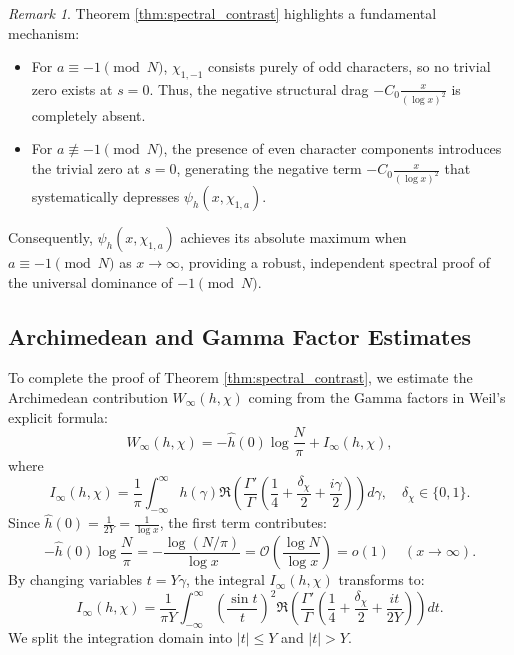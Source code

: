 \documentclass[12pt,reqno]{amsart}
\theoremstyle{definition}
\theoremstyle{remark}
\newtheorem{remark}[theorem]{Remark}
\numberwithin{equation}{section}
\begin{document}
\begin{remark}
Theorem \ref{thm:spectral_contrast} highlights a fundamental mechanism:
\begin{itemize}
    \item For $a \equiv -1 \pmod N$, $\chi_{1,-1}$ consists purely of odd characters, so no trivial zero exists at $s = 0$. Thus, the negative structural drag $-C_0 \frac{x}{(\log x)^2}$ is completely absent.
    \item For $a \not\equiv -1 \pmod N$, the presence of even character components introduces the trivial zero at $s = 0$, generating the negative term $-C_0 \frac{x}{(\log x)^2}$ that systematically depresses $\psi_h(x, \chi_{1,a})$.
\end{itemize}
Consequently, $\psi_h(x, \chi_{1,a})$ achieves its absolute maximum when $a \equiv -1 \pmod N$ as $x \to \infty$, providing a robust, independent spectral proof of the universal dominance of $-1 \pmod N$.
\end{remark}

\subsection{Archimedean and Gamma Factor Estimates}
\label{subsec:gamma_factor}

To complete the proof of Theorem \ref{thm:spectral_contrast}, we estimate the Archimedean contribution $W_\infty(h, \chi)$ coming from the Gamma factors in Weil's explicit formula:
\[
W_\infty(h, \chi) = -\hat{h}(0) \log \frac{N}{\pi} + I_\infty(h, \chi),
\]
where
\[
I_\infty(h, \chi) = \frac{1}{\pi} \int_{-\infty}^{\infty} h(\gamma) \mathfrak{R}\left( \frac{\Gamma'}{\Gamma}\left( \frac{1}{4} + \frac{\delta_\chi}{2} + \frac{i\gamma}{2} \right) \right) d\gamma, \quad \delta_\chi \in \{0, 1\}.
\]
Since $\hat{h}(0) = \frac{1}{2Y} = \frac{1}{\log x}$, the first term contributes:
\[
-\hat{h}(0) \log \frac{N}{\pi} = -\frac{\log(N/\pi)}{\log x} = \mathcal{O}\left( \frac{\log N}{\log x} \right) = o(1) \quad (x \to \infty).
\]
By changing variables $t = Y\gamma$, the integral $I_\infty(h, \chi)$ transforms to:
\[
I_\infty(h, \chi) = \frac{1}{\pi Y} \int_{-\infty}^{\infty} \left( \frac{\sin t}{t} \right)^2 \mathfrak{R}\left( \frac{\Gamma'}{\Gamma}\left( \frac{1}{4} + \frac{\delta_\chi}{2} + \frac{i t}{2Y} \right) \right) dt.
\]
We split the integration domain into $|t| \le Y$ and $|t| > Y$.
\end{document}

